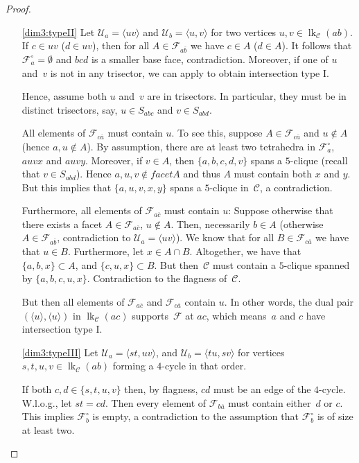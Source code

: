 \documentclass[a4paper,12pt]{amsart}
\theoremstyle{plain}
\theoremstyle{definition}
\newcommand{\U}{\mathcal U}
\newcommand{\C}{\mathcal C}
\newcommand{\family}{\mathcal F}
\newcommand{\facetA}{A}
\newcommand{\facetB}{B}
\DeclareMathOperator{\link}{lk}
\begin{document}
\begin{proof}
\begin{enumerate}
 \item[\eqref{dim3:typeII}]  Let $\U_a = \langle uv \rangle$ and $\U_b = \langle u,v \rangle$ for two vertices $u,v \in \link_\C (ab)$. If $c \in uv$ ($d \in uv$), then for all $\facetA \in \family_{a\overline b}$ we have $c \in \facetA$ ($d \in \facetA$). It follows that $\family_a^\circ = \emptyset$ and $bcd$ is a smaller base face, contradiction. Moreover, if one of $u$ and~$v$ is not in any trisector, we can apply  to obtain intersection type I.

Hence, assume both $u$ and~$v$ are in trisectors. In particular, they must be in distinct trisectors, say, $u \in S_{abc}$ and $v \in S_{abd}$.

All elements of $\family_{c \overline a}$ must contain $u$. To see this, suppose $\facetA \in \family_{c \overline a}$ and $u \not \in \facetA$ (hence $a,u \not \in \facetA$). By assumption, there are at least two tetrahedra in $\family_a^\circ$, $auvx$ and $auvy$. Moreover, if $v \in \facetA$, then  $\{a,b,c,d,v\}$ spans a $5$-clique (recall that $v \in S_{abd}$). Hence $a,u,v \not \in facetA$ and thus $\facetA$ must contain both $x$ and $y$. But this implies that $\{a,u,v,x,y\}$ spans a $5$-clique in~$\C$, a contradiction.

Furthermore, all elements of $\family_{a \overline c}$ must contain $u$: Suppose otherwise that there exists a facet $\facetA \in \family_{a \overline c}$, $u \not \in \facetA$. Then, necessarily $b \in \facetA$ (otherwise $\facetA \in \family_{a \overline b}$, contradiction to $\U_a = \langle uv \rangle$). We know that for all $\facetB \in \family_{c \overline a}$ we have that $u \in \facetB$. Furthermore, let $x \in \facetA \cap \facetB$. Altogether, we have that $\{a,b,x\}\subset \facetA$, and $\{ c,u,x\} \subset \facetB$. But then~$\C$ must contain a $5$-clique spanned by $\{a,b,c,u,x\}$. Contradiction to the flagness of~$\C$.

But then all elements of $\family_{a \overline c}$ and $\family_{c \overline a}$ contain $u$. In other words, the dual pair $(\langle u \rangle,\langle u \rangle)$ in $\link_\C (ac)$ supports~$\family$ at $ac$, which means~$a$ and $c$ have intersection type I.

  \item[\eqref{dim3:typeIII}] Let $\U_a = \langle st, uv \rangle$, and $\U_b = \langle tu, sv \rangle$ for vertices $s,t,u,v \in \link_\C (ab)$ forming a $4$-cycle in that order.

If both $c,d \in \{s,t,u,v \}$ then, by flagness, $cd$ must be an edge of the $4$-cycle. W.l.o.g., let $st = cd$. Then every element of $\family_{b \overline a}$ must contain either~$d$ or $c$. This implies $\family_b^\circ$ is empty, a contradiction to the assumption that $\family_b^\circ$ is of size at least two.


\end{enumerate}
\end{proof}
\end{document}
